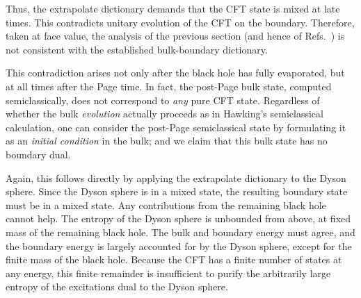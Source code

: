 \documentclass[12pt,letterpaper]{article}
\begin{document}
Thus, the extrapolate dictionary demands that the CFT state is mixed at late times. This contradicts unitary evolution of the CFT on the boundary. Therefore, taken at face value, the analysis of the previous section (and hence of Refs.~\cite{Pen19,AEMM}) is not consistent with the established bulk-boundary dictionary.

This contradiction arises not only after the black hole has fully evaporated, but at all times after the Page time. In fact, the post-Page bulk state, computed semiclassically, does not correspond to {\em any\/} pure CFT state. Regardless of whether the bulk {\em evolution\/} actually proceeds as in Hawking's semiclassical calculation, one can consider the post-Page semiclassical state by formulating it as an {\em initial condition\/} in the bulk; and we claim that this bulk state has no boundary dual.

Again, this follows directly by applying the extrapolate dictionary to the Dyson sphere. Since the Dyson sphere is in a mixed state, the resulting boundary state must be in a mixed state. Any contributions from the remaining black hole cannot help. The entropy of the Dyson sphere is unbounded from above, at fixed mass of the remaining black hole. The bulk and boundary energy must agree, and the boundary energy is largely accounted for by the Dyson sphere, except for the finite mass of the black hole. Because the CFT has a finite number of states at any energy, this finite remainder is insufficient to purify the arbitrarily large entropy of the excitations dual to the Dyson sphere.
\end{document}

